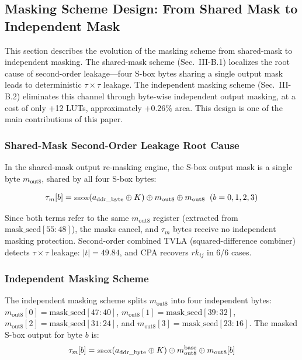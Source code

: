 \documentclass[journal]{IEEEtran}
\begin{document}
\subsection{Masking Scheme Design: From Shared Mask to Independent Mask}

This section describes the evolution of the masking scheme from shared-mask to independent masking. The shared-mask scheme (Sec.~III-B.1) localizes the root cause of second-order leakage---four S-box bytes sharing a single output mask leads to deterministic $\tau\times\tau$ leakage. The independent masking scheme (Sec.~III-B.2) eliminates this channel through byte-wise independent output masking, at a cost of only +12 LUTs, approximately +0.26\% area. This design is one of the main contributions of this paper.

\subsubsection{Shared-Mask Second-Order Leakage Root Cause}

In the shared-mask output re-masking engine, the S-box output mask is a single byte $m_{\text{out8}}$, shared by all four S-box bytes:

\begin{equation}\tiny
\tau_m[b] = \text{SBOX}(a_{\text{ddr\_byte}} \oplus K) \oplus m_{\text{out8}} \oplus m_{\text{out8}} \;\; (b=0,1,2,3)
\end{equation}

Since both terms refer to the same $m_{\text{out8}}$ register (extracted from $\text{mask\_seed}[55:48]$), the masks cancel, and $\tau_m$ bytes receive no independent masking protection. Second-order combined TVLA (squared-difference combiner) detects $\tau\times\tau$ leakage: $|t|=49.84$, and CPA recovers $rk_{ij}$ in 6/6 cases.

\subsubsection{Independent Masking Scheme}

The independent masking scheme splits $m_{\text{out8}}$ into four independent bytes: $m_{\text{out8}}[0] = \text{mask\_seed}[47:40]$, $m_{\text{out8}}[1] = \text{mask\_seed}[39:32]$, $m_{\text{out8}}[2] = \text{mask\_seed}[31:24]$, and $m_{\text{out8}}[3] = \text{mask\_seed}[23:16]$. The masked S-box output for byte $b$ is:
\begin{equation}\tiny
\tau_m[b] = \text{SBOX}(a_{\text{ddr\_byte}} \oplus K) \oplus m_{\text{out8}}^{\text{base}} \oplus m_{\text{out8}}[b]
\end{equation}
\end{document}
